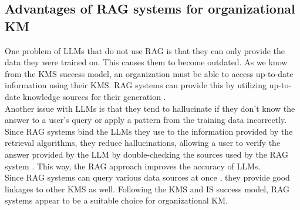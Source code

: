 \documentclass[
	english,
	ruledheaders=section,%
	class=report,%
	thesis={type=bachelor},%
	accentcolor=1b,%
	custommargins=true,%
	marginpar=false,%
	parskip=half-,%
	fontsize=11pt,%
	DIV=14,
]{tudapub}
\begin{document}
\subsection{Advantages of RAG systems for organizational KM}
One problem of LLMs that do not use RAG is that they can only provide the data they were trained on. This causes them to become outdated. As we know from the KMS success model, an organization must be able to access up-to-date information using their KMS. RAG systems can provide this by utilizing up-to-date knowledge sources for their generation \parencite[p.~9459]{Lewis2020}.\\
Another issue with LLMs is that they tend to hallucinate if they don't know the answer to a user's query or apply a pattern from the training data incorrectly. Since RAG systems bind the LLMs they use to the information provided by the retrieval algorithms, they reduce hallucinations, allowing a user to verify the answer provided by the LLM by double-checking the sources used by the RAG system \parencite[p.~9469]{Lewis2020}. This way, the RAG approach improves the accuracy of LLMs.\\
Since RAG systems can query various data sources at once \parencite{GoogleCloudRAG}, they provide good linkages to other KMS as well. Following the KMS and IS success model, RAG systems appear to be a suitable choice for organizational KM. \\
\end{document}
